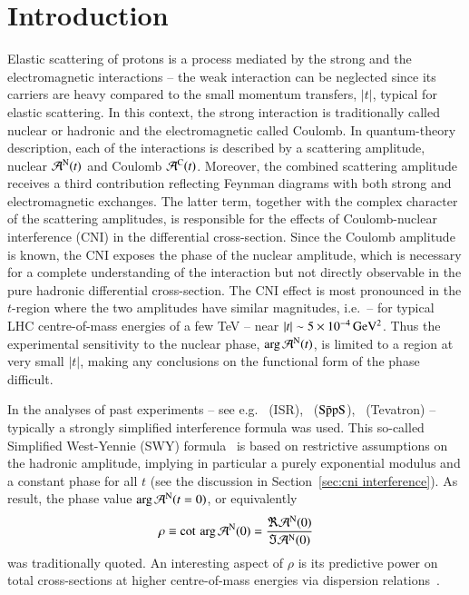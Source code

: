 \section{Introduction}
\label{sec:introduction}

Elastic scattering of protons is a process mediated by the strong and the electromagnetic interactions -- the weak interaction can be neglected since its carriers are heavy compared to the small momentum transfers, $|t|$, typical for elastic scattering. In this context, the strong interaction is traditionally called nuclear or hadronic and the electromagnetic called Coulomb. In quantum-theory description, each of the interactions is described by a scattering amplitude, nuclear ${\cal A}^{\rm N}(t)$ and Coulomb ${\cal A}^{\rm C}(t)$. Moreover, the combined scattering amplitude receives a third contribution reflecting Feynman diagrams with both strong and electromagnetic exchanges. The latter term, together with the complex character of the scattering amplitudes, is responsible for the effects of Coulomb-nuclear interference (CNI) in the differential cross-section. Since the Coulomb amplitude is known, the CNI exposes the phase of the nuclear amplitude, which is necessary for a complete understanding of the interaction but not directly observable in the pure hadronic differential cross-section. The CNI effect is most pronounced in the $t$-region where the two amplitudes have similar magnitudes, i.e.~-- for typical LHC centre-of-mass energies of a few TeV -- near $|t| \sim 5 \times 10^{-4}\,\rm GeV^{2}$. Thus the experimental sensitivity to the nuclear phase, $\arg {\cal A}^{\rm N}(t)$, is limited to a region at very small $|t|$, making any conclusions on the 
functional form of the phase difficult.

In the analyses of past experiments -- see e.g.~\cite{plb43,plb66,npb141,prl47,plb115,plb120,plb128,npb262} 
(ISR),~\cite{plb198,plb316} ($\rm S\bar{p}pS$),~\cite{prl68} (Tevatron) --
typically a strongly simplified interference formula was used. This so-called
Simplified West-Yennie (SWY) formula~\cite{wy68} is based on restrictive assumptions on the 
hadronic amplitude, implying in particular a purely exponential modulus and a 
constant phase for all $t$ (see the discussion in 
Section~\ref{sec:cni interference}).
As result, the phase value $\arg {\cal A}^{\rm N} (t=0)$, or
equivalently
\begin{equation}
\label{eq:rho def}
\rho \equiv \cot \, \arg {\cal A}^{\rm N} (0) = \frac{\Re {\cal A}^{\rm N} (0)}{\Im {\cal A}^{\rm N} (0)}
\end{equation}
was traditionally quoted. 
An interesting aspect of $\rho$ is its predictive power on total cross-sections at higher centre-of-mass energies via dispersion 
relations~\cite{dremin-dispersion}. 

